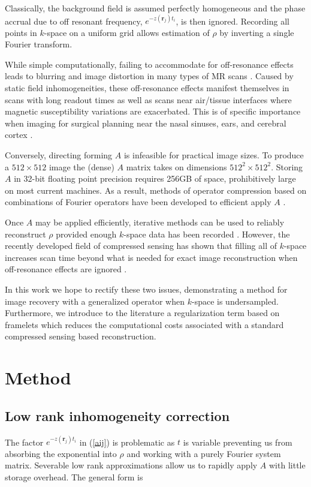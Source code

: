 \documentclass[12pt]{amsart}
\theoremstyle{remark}
\begin{document}
Classically, the background field is assumed perfectly homogeneous and the phase accrual due to off resonant frequency, $e^{-z(\mathbf{r}_j)t_i}$, is then ignored. Recording all points in $k$-space on a uniform grid allows estimation of $\rho$ by inverting a single Fourier transform.

While simple computationally, failing to accommodate for off-resonance effects leads to blurring and image distortion in many types of MR scans \cite{Lai}. Caused by static field inhomogeneities, these off-resonance effects manifest themselves in scans with long readout times as well as scans near air/tissue interfaces where magnetic susceptibility variations are exacerbated. This is of specific importance when imaging for surgical planning near the nasal sinuses, ears, and cerebral cortex \cite{Moerland1995} \cite{Neufeld2005}.

Conversely, directing forming $A$ is infeasible for practical image sizes. To produce a $512 \times 512$ image the (dense) $A$ matrix takes on dimensions $512^2 \times 512^2$. Storing $A$ in 32-bit floating point precision requires 256GB of space, prohibitively large on most current machines. As a result, methods of operator compression based on combinations of Fourier operators have been developed to efficient apply $A$ \cite{Fessler2010}.

Once $A$ may be applied efficiently, iterative methods can be used to reliably reconstruct $\rho$ provided enough $k$-space data has been recorded \cite{Sutton2003}. However, the recently developed field of compressed sensing has shown that filling all of $k$-space increases scan time beyond what is needed for exact image reconstruction when off-resonance effects are ignored \cite{Romberg2007}.

In this work we hope to rectify these two issues, demonstrating a method for image recovery with a generalized operator when $k$-space is undersampled. Furthermore, we introduce to the literature a regularization term based on framelets which reduces the computational costs associated with a standard compressed sensing based reconstruction.



\section{Method}

\subsection{Low rank inhomogeneity correction}
The factor $e^{-z(\mathbf{r}_j)t_i}$ in (\ref{aij}) is problematic as $t$ is variable preventing us from absorbing the exponential into $\rho$ and working with a purely Fourier system matrix. Severable low rank approximations allow us to rapidly apply $A$ with little storage overhead. The general form is 
\end{document}
